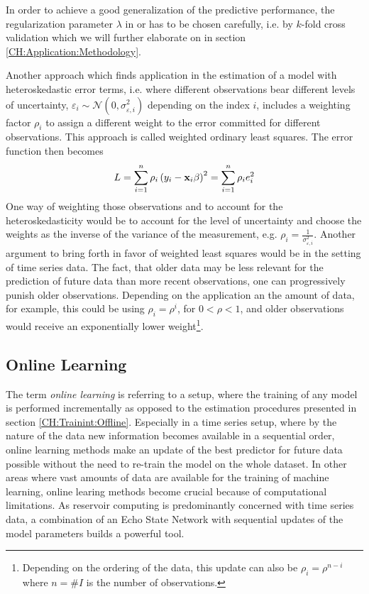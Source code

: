 In order to achieve a good generalization of the predictive performance, the regularization parameter $\lambda$ in  or  has to be chosen carefully, i.e. by $k$-fold cross validation which we will further elaborate on in section \ref{CH:Application:Methodology}.

Another approach which finds application in the estimation of a model with heteroskedastic error terms, i.e. where different observations bear different levels of uncertainty, $\varepsilon_i \sim \mathcal{N}(0, \sigma_{\varepsilon,i}^2)$ depending on the index $i$, includes a weighting factor $\rho_i$ to assign a different weight to the error committed for different observations. This approach is called weighted ordinary least squares. The error function then becomes
\begin{equation}
    L = \sum_{i=1}^{n} \rho_i \left(y_i - {\bf x}_i \beta\right)^2 = \sum_{i=1}^{n} \rho_i e_i^2 \label{EQ:WeightedOLS}
\end{equation}
One way of weighting those observations and to account for the heteroskedasticity would be to account for the level of uncertainty and choose the weights as the inverse of the variance of the measurement, e.g. $\rho_i = \frac{1}{\sigma_{\varepsilon, i}^2}$. 
Another argument to bring forth in favor of weighted least squares would be in the setting of time series data. The fact, that older data may be less relevant for the prediction of future data than more recent observations, one can progressively punish older observations. Depending on the application an the amount of data, for example, this could be using $\rho_i = \rho^{i}$, for $0< \rho < 1$, and older observations would receive an exponentially lower weight\footnote{Depending on the ordering of the data, this update can also be $\rho_i = \rho^{n-i}$ where $n = \#I$ is the number of observations.}.

\subsection{Online Learning}
\label{CH:LinearRegression:Online}

The term \textit{online learning} is referring to a setup, where the training of any model is performed incrementally as opposed to the estimation procedures presented in section \ref{CH:Trainint:Offline}. Especially in a time series setup, where by the nature of the data new information becomes available in a sequential order, online learning methods make an update of the best predictor for future data possible without the need to re-train the model on the whole dataset. In other areas where vast amounts of data are available for the training of machine learning, online learing methods become crucial because of computational limitations.
As reservoir computing is predominantly concerned with time series data, a combination of an Echo State Network with sequential updates of the model parameters builds a powerful tool.

